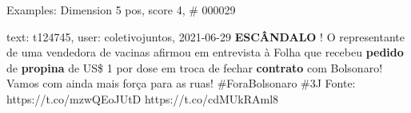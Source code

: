 \begin{frame}{Examples: Dimension 5 pos, score 4, \# 000029}
\footnotesize
\begin{exampleblock}{text: t124745, user: coletivojuntos, 2021-06-29}
\textbf{ESCÂNDALO} ! O representante de uma vendedora de vacinas afirmou em 
entrevista à Folha que recebeu \textbf{pedido} de \textbf{propina} de US\$ 1 
por dose em troca de fechar \textbf{contrato} com Bolsonaro! Vamos com ainda 
mais força para as ruas! \#ForaBolsonaro \#3J Fonte: https://t.co/mzwQEoJUtD 
https://t.co/cdMUkRAml8 
\end{exampleblock}
\end{frame}
